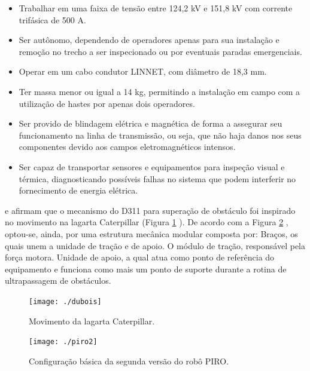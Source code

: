 \begin{itemize}
	\item Trabalhar em uma faixa de tensão entre 124,2 kV e 151,8 kV com corrente trifásica de 500 A.
	\item Ser autônomo, dependendo de operadores apenas para sua instalação e remoção no trecho a ser inspecionado ou por eventuais paradas emergenciais.
	\item Operar em um cabo condutor LINNET, com diâmetro de 18,3 mm.
	\item Ter massa menor ou igual a 14 kg, permitindo a instalação em campo com a utilização de hastes por apenas dois operadores. 
	\item Ser provido de blindagem elétrica e magnética de forma a assegurar seu funcionamento na linha de transmissão, ou seja, que não haja danos nos seus componentes devido aos campos eletromagnéticos intensos.
	\item Ser capaz de transportar sensores e equipamentos para inspeção visual e térmica, diagnosticando possíveis falhas no sistema que podem interferir no fornecimento de energia elétrica.
\end{itemize}

 e  afirmam que o mecanismo do D311 para superação de obstáculo foi inspirado no movimento na lagarta Caterpillar (Figura \ref{img:dubois} ). De acordo com a Figura \ref{img:piro2} , optou-se, ainda, por uma estrutura mecânica modular composta por: Braços, os quais unem a unidade de tração e de apoio. O módulo de tração, responsável pela força motora. Unidade de apoio, a qual atua como ponto de referência do equipamento e funciona como mais um ponto de suporte durante a rotina de ultrapassagem de obstáculos. 

\begin{figure} [h!]	
	\caption{Movimento da lagarta Caterpillar.}
	\label{img:dubois}											 
	\centering													 
	\texttt{[image: ./dubois]}
\end{figure}													 

\begin{figure} [h!]	
	\caption{Configuração básica da segunda versão do robô PIRO.}
	\label{img:piro2}											 
	\centering													 
	\texttt{[image: ./piro2]}
\end{figure}													 

